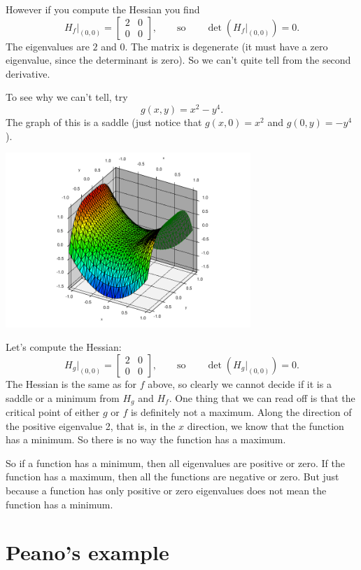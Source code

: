 \documentclass[12pt]{article}
\begin{document}
However if you compute the Hessian  you find
\[
H_f\big|_{(0,0)} =
\begin{bmatrix}
2 & 0 \\
0 & 0
\end{bmatrix} ,
\qquad \text{so} \qquad
\det(H_f\big|_{(0,0)}) = 0 .
\]
The eigenvalues are $2$ and $0$.
The matrix is degenerate (it must have a zero eigenvalue, since the
determinant is zero).  So we can't quite tell from the second derivative.

To see why we can't tell, try
\[
g(x,y) = x^2 - y^4 .
\]
The graph of this is a saddle (just notice that $g(x,0) = x^2$ and
$g(0,y) = -y^4$).
\begin{center}
\includegraphics[width=3.65in]{degenerate-saddle.pdf}
\end{center}

Let's compute the Hessian:
\[
H_g\big|_{(0,0)} =
\begin{bmatrix}
2 & 0 \\
0 & 0
\end{bmatrix}
,
\qquad \text{so} \qquad
\det(H_g\big|_{(0,0)}) = 0 .
\]
The Hessian is the same as for $f$ above, so clearly we cannot decide
if it is a saddle or a minimum
from $H_g$ and $H_f$.  One thing that we can read off is that the critical
point of either $g$ or $f$ is definitely not a maximum.
Along the direction of the positive eigenvalue 2, that is, in the $x$
direction, we know that the function
has a minimum.  So there is no way the function has a maximum.

So if a function has a minimum, then all eigenvalues are positive or
zero.  If the function has a maximum, then all the functions are negative or
zero.  But just because a function has only positive or zero eigenvalues
does not mean the function has a minimum.

\section*{Peano's example}
\end{document}

